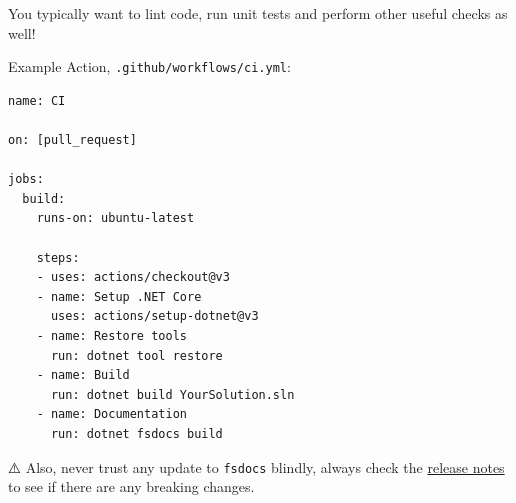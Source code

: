 \documentclass{article}
\begin{document}
You typically want to lint code, run unit tests and perform other useful checks as well!


Example Action, \texttt{.github/workflows/ci.yml}:
\begin{lstlisting}
name: CI

on: [pull_request]

jobs:
  build:
    runs-on: ubuntu-latest

    steps:
    - uses: actions/checkout@v3
    - name: Setup .NET Core
      uses: actions/setup-dotnet@v3
    - name: Restore tools
      run: dotnet tool restore
    - name: Build
      run: dotnet build YourSolution.sln
    - name: Documentation
      run: dotnet fsdocs build

\end{lstlisting}


⚠️ Also, never trust any update to \texttt{fsdocs} blindly, always check the \href{https://github.com/fsprojects/FSharp.Formatting/blob/main/RELEASE\_NOTES.md}{release notes} to see if there are any breaking changes.
\end{document}
